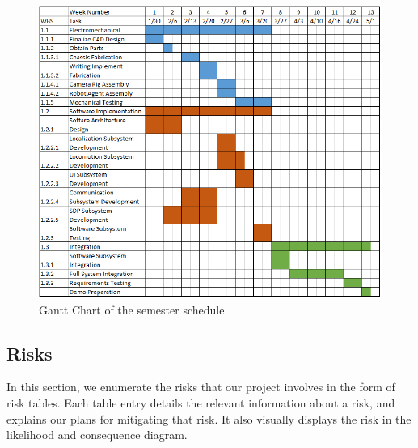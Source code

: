 \begin{figure}[ht!]
 \centering
  \includegraphics[width=0.99\columnwidth]{figures/gantt_chart.png}
  \caption{Gantt Chart of the semester schedule}
 \label{fig:gantt_chart}
\end{figure}

\clearpage

\subsection{Risks}
\label{sec:risks}

In this section, we enumerate the risks that our project involves in the form of risk tables. Each table entry details the relevant information about a risk, and explains our plans for mitigating that risk. It also visually displays the risk in the likelihood and consequence diagram. 

